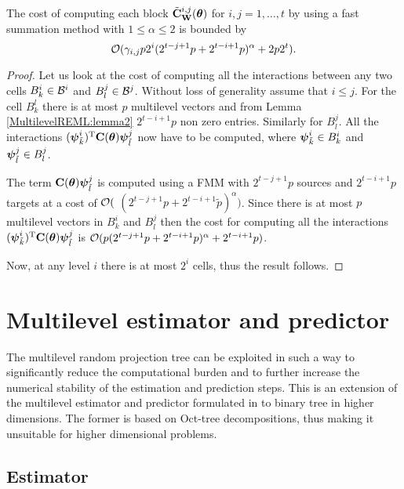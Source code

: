 \documentclass[11pt,final]{amsart}       %
\begin{document}
\begin{prop} 
  The cost of computing each block $\tilde{\mathbf{C}}^{i,j}_{\mathbf{W}}(\boldsymbol{\theta})$
for $i,j = 1,\dots,t$ by using a fast summation method with $1 \leq
\alpha \leq 2$ is bounded by
\[
{\mathcal O}(\gamma_{i,j} p 2^{i} (2^{t-j+1} p + 2^{t-i+1} p)^{\alpha} + 2p 2^{t}).
\]
\end{prop} 
\begin{proof} Let us look at the cost of computing all the 
interactions between any two cells $B^{i}_k \in {\mathcal B}^{i}$ and
$B^{j}_l \in {\mathcal B}^{j}$. Without loss of generality assume that $i
\leq j$. For the cell $B^{l}_k$ there is at most $p$
multilevel vectors and from Lemma \ref{MultilevelREML:lemma2}
$2^{t-i+1} p$ non zero entries. Similarly for $B^{j}_l$.  All
the interactions $(\boldsymbol{\psi}^{i}_{\tilde{k}})^{\rm T} \mathbf{C}(\boldsymbol{\theta})
\boldsymbol{\psi}^{j}_{\tilde{l}}$ now have to be computed, where
$\boldsymbol{\psi}^{i}_{\tilde{k}} \in B^{i}_k$ and $\boldsymbol{\psi}^{j}_{\tilde{l}} \in
B^{j}_l$.

The term $\mathbf{C}(\boldsymbol{\theta}) \boldsymbol{\psi}^{j}_{\tilde{l}}$ is computed using a FMM
with $2^{t-j+1} p$ sources and $2^{t-i+1} p$ targets at a cost of
${\mathcal O}($ $(2^{t-j+1} p + 2^{t-i+1} \tilde p)^{\alpha})$.  Since there
is at most $p$ multilevel vectors in $B^{i}_k$ and $B^{j}_l$ then the
cost for computing all the interactions $(\boldsymbol{\psi}^{i}_{\tilde{k}})^{\rm T}
\mathbf{C}(\boldsymbol{\theta}) \boldsymbol{\psi}^{j}_{\tilde{l}}$ is ${\mathcal O}(p(2^{t-j+1} p + 2^{t-i+1}
p)^{\alpha} + 2^{t-i+1}p)$.

Now, at any level $i$ there is at most $2^{i}$ cells, thus the result
follows.
\end{proof}




\section{Multilevel estimator and predictor}
\label{multilevelestimator}
The multilevel random projection tree can be exploited in such a way
to significantly reduce the computational burden and to further
increase the numerical stability of the estimation and prediction
steps. This is an extension of the multilevel estimator and predictor
formulated in \cite{Castrillon2015} to binary tree in higher
dimensions. The former is based on Oct-tree decompositions, thus
making it unsuitable for higher dimensional problems.

\subsection{Estimator}
\end{document}
